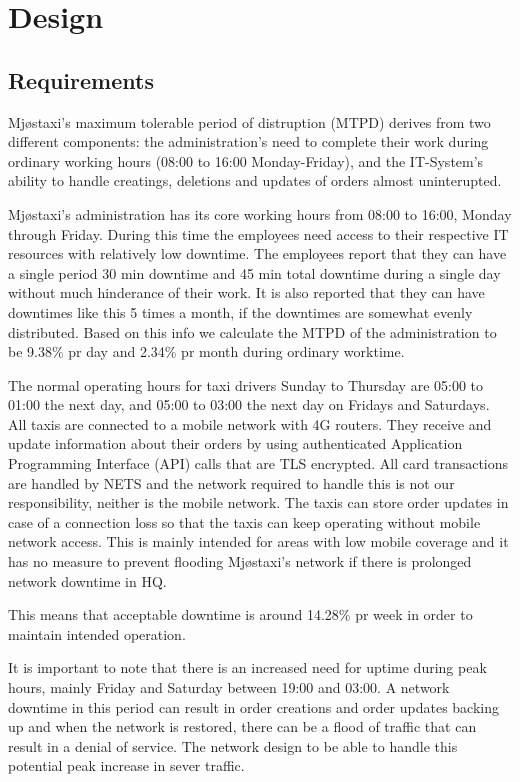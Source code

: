 \chapter{Design}
\label{chap:design}

\section{Requirements}
Mjøstaxi's maximum tolerable period of distruption (MTPD) derives from two different components: the administration's need to complete their work during ordinary working hours (08:00 to 16:00 Monday-Friday),
and the IT-System's ability to handle creatings, deletions and updates of orders almost uninterupted.

Mjøstaxi's administration has its core working hours from 08:00 to 16:00, Monday through Friday.
During this time the employees need access to their respective IT resources with relatively low downtime.
The employees report that they can have a single period 30 min downtime and 45 min total downtime during a single day without much hinderance of their work.
It is also reported that they can have downtimes like this 5 times a month, if the downtimes are somewhat evenly distributed.
Based on this info we calculate the MTPD of the administration to be 9.38\% pr day and 2.34\% pr month during ordinary worktime.


The normal operating hours for taxi drivers Sunday to Thursday are 05:00 to 01:00 the next day, and 05:00 to 03:00 the next day on Fridays and Saturdays.
All taxis are connected to a mobile network with 4G routers.
They receive and update information about their orders by using authenticated Application Programming Interface (API) calls that are TLS encrypted.
All card transactions are handled by NETS and the network required to handle this is not our responsibility, neither is the mobile network.
The taxis can store order updates in case of a connection loss so that the taxis can keep operating without mobile network access.
This is mainly intended for areas with low mobile coverage and it has no measure to prevent flooding Mjøstaxi's network if there is prolonged network downtime in HQ.

This means that acceptable downtime is around 14.28\% pr week in order to maintain intended operation.

It is important to note that there is an increased need for uptime during peak hours, mainly Friday and Saturday between 19:00 and 03:00.
A network downtime in this period can result in order creations and order updates backing up and when the network is restored, there can be a flood of traffic that can result in a denial of service.
The network design to be able to handle this potential peak increase in sever traffic.



